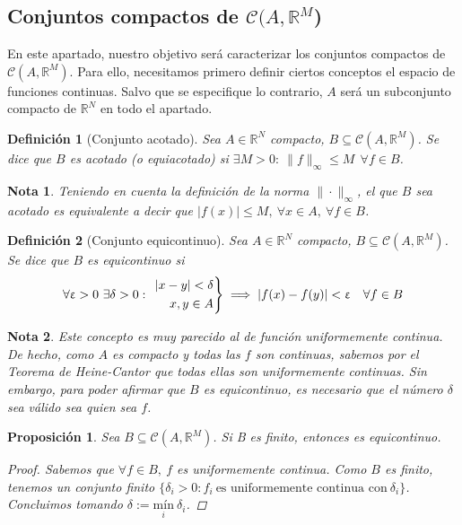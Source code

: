 \documentclass[11pt, a4paper]{article}
\let\epsilon\upvarepsilon
\theoremstyle{theorem-style}
\newtheorem{nprop}{Proposición}[section]
\theoremstyle{definition-style}
\newtheorem{ndef}{Definición}[section]
\theoremstyle{remark-style}
\newtheorem*{nota}{Nota}
\theoremstyle{example-style}
\newenvironment{rcases}
{\left.\begin{aligned}}
    {\end{aligned}\right\rbrace}
\begin{document}
\subsection{Conjuntos compactos de $\mathcal{C}(A, \mathbb{R}^M$)}

En este apartado, nuestro objetivo será caracterizar los conjuntos compactos de $\mathcal{C}(A,\mathbb{R}^M)$. Para ello, necesitamos primero definir ciertos conceptos el espacio de funciones continuas. Salvo que se especifique lo contrario, $A$ será un subconjunto compacto de $\mathbb{R}^N$ en todo el apartado.

\begin{ndef}[Conjunto acotado]
  Sea $A \in \mathbb{R}^N$ compacto, $B \subseteq \mathcal{C}(A,\mathbb{R}^M)$. Se dice que $B$ es acotado (o equiacotado) si $\exists M > 0: \ \|f\|_{\infty} \le M \ \ \forall f \in B$.
\end{ndef}

\begin{nota}
  Teniendo en cuenta la definición de la norma $\|\cdot\|_\infty$, el que $B$ sea acotado es equivalente a decir que $|f(x)|\le M,\ \forall x \in A,\ \forall f \in B$.
\end{nota}

\begin{ndef}[Conjunto equicontinuo]
  Sea $A \in \mathbb{R}^N$ compacto, $B \subseteq \mathcal{C}(A,\mathbb{R}^M)$. Se dice que $B$ es equicontinuo si $$\forall \epsilon > 0\ \exists \delta > 0:\ \begin{rcases} |x-y| < \delta\\ x,y \in A \end{rcases} \implies |f(x) - f(y)| < \epsilon \quad \forall f \in B$$
\end{ndef}

\begin{nota}
  Este concepto es muy parecido al de función uniformemente continua. De hecho, como $A$ es compacto y todas las $f$ son continuas, sabemos por el \textit{Teorema de Heine-Cantor} que todas ellas son uniformemente continuas. Sin embargo, para poder afirmar que $B$ es equicontinuo, es necesario que el número $\delta$ sea válido sea quien sea $f$. 
\end{nota}

\begin{nprop} Sea $B \subseteq \mathcal{C}(A,\mathbb{R}^M)$. Si B es finito, entonces es equicontinuo.

  \begin{proof}
    Sabemos que $\forall f \in B,\ f$ es uniformemente continua. Como $B$ es finito, tenemos un conjunto finito $\{\delta_i > 0 : f_i \ \text{es uniformemente continua con} \ \delta_i\}$. Concluimos tomando $\delta := \underset{i}{\text{mín}} \ \delta_i$.
  \end{proof}
\end{nprop}
\end{document}
